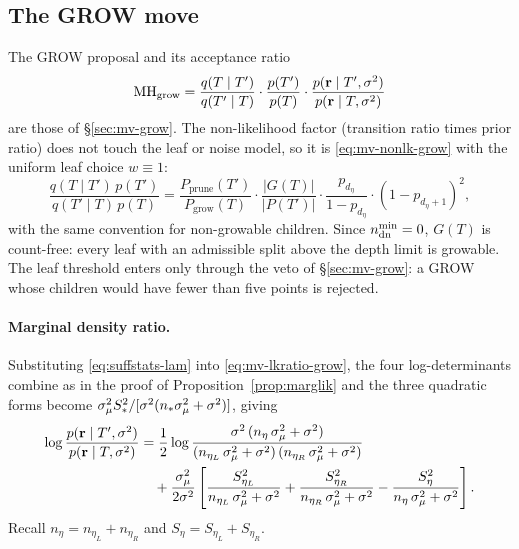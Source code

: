 \subsection{The GROW move}
\label{sec:grow}

The GROW proposal and its acceptance ratio
\begin{equation}
	\label{eq:mh}
	\mathrm{MH}_{\mathrm{grow}}
	= \frac{q(T \mid T')}{q(T' \mid T)}
	\cdot \frac{p(T')}{p(T)}
	\cdot \frac{p(\mathbf{r} \mid T', \sigma^{2})}{p(\mathbf{r} \mid T, \sigma^{2})}
\end{equation}
are those of \S\ref{sec:mv-grow}. The non-likelihood factor (transition
ratio times prior ratio) does not touch the leaf or noise model, so it is
\eqref{eq:mv-nonlk-grow} with the uniform leaf choice $w \equiv 1$:
\begin{equation}
	\label{eq:nonlk-grow}
	\frac{q(T \mid T')\,p(T')}{q(T' \mid T)\,p(T)}
	= \frac{P_{\mathrm{prune}}(T')}{P_{\mathrm{grow}}(T)} \cdot
	\frac{|G(T)|}{|P(T')|} \cdot
	\frac{p_{d_\eta}}{1 - p_{d_\eta}} \cdot
	(1 - p_{d_\eta+1})^{2},
\end{equation}
with the same convention for non-growable children. Since $n^{\min}_{\mathrm{dn}} = 0$,
$G(T)$ is count-free: every leaf with an admissible split above the depth
limit is growable. The leaf threshold enters only through the veto of
\S\ref{sec:mv-grow}: a GROW whose children would have fewer than five points
is rejected.

\paragraph{Marginal density ratio.}
Substituting \eqref{eq:suffstats-lam} into \eqref{eq:mv-lkratio-grow}, the
four log-determinants combine as in the proof of
Proposition~\ref{prop:marglik} and the three quadratic forms become
$\sigma_\mu^{2} S_*^2/[\sigma^{2}(n_*\sigma_\mu^{2} + \sigma^{2})]$, giving
\begin{align}
	\label{eq:lkratio-grow}
	\log\frac{p(\mathbf{r} \mid T', \sigma^{2})}{p(\mathbf{r} \mid T, \sigma^{2})}
	 & = \frac{1}{2}\log\frac{\sigma^{2}\,(n_\eta\,\sigma_\mu^{2} + \sigma^{2})}
	                    {(n_{\eta_L}\,\sigma_\mu^{2} + \sigma^{2})\,(n_{\eta_R}\,\sigma_\mu^{2} + \sigma^{2})}
	\notag                                                                              \\
	 & \quad + \frac{\sigma_\mu^{2}}{2\sigma^{2}}\left[
		                                \frac{S_{\eta_L}^{2}}{n_{\eta_L}\,\sigma_\mu^{2} + \sigma^{2}}
		                                + \frac{S_{\eta_R}^{2}}{n_{\eta_R}\,\sigma_\mu^{2} + \sigma^{2}}
		                                - \frac{S_\eta^{2}}{n_\eta\,\sigma_\mu^{2} + \sigma^{2}}
		                                \right].
\end{align}
Recall $n_\eta = n_{\eta_L} + n_{\eta_R}$ and $S_\eta = S_{\eta_L} + S_{\eta_R}$.


